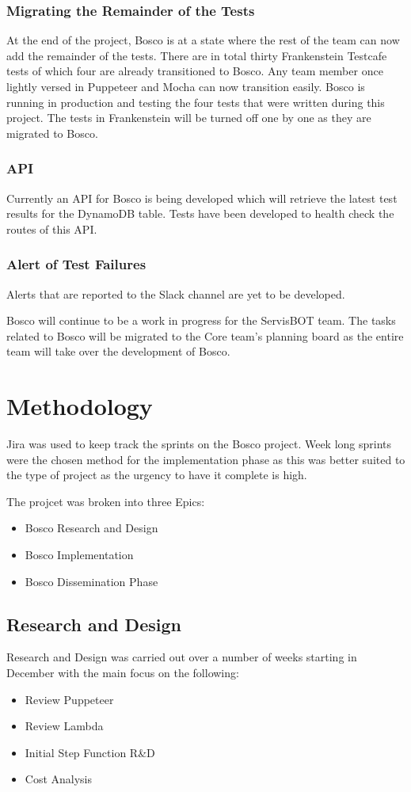 \documentclass[12pt,a4paper,titlepage]{report}
\begin{document}
\subsection{Migrating the Remainder of the Tests}
At the end of the project, Bosco is at a state where the rest of the team can now add the remainder of the tests. 
There are in total thirty Frankenstein Testcafe tests of which four are already transitioned to Bosco. Any team member once lightly versed in Puppeteer and Mocha can now transition easily. 
Bosco is running in production and testing the four tests that were written during this project. The tests in Frankenstein will be turned off one by one as 
they are migrated to Bosco. 

\subsection{API}
Currently an API for Bosco is being developed which will retrieve the latest test results for the DynamoDB table. 
Tests have been developed to health check the routes of this API. 

\subsection{Alert of Test Failures}
Alerts that are reported to the Slack channel are yet to be developed.

Bosco will continue to be a work in progress for the ServisBOT team. 
The tasks related to Bosco will be migrated to the Core team's planning board as the entire team will take over the development of Bosco. 

\appendix
\chapter{Methodology}
Jira was used to keep track the sprints on the Bosco project. Week long sprints were the chosen method for the implementation phase as this
was better suited to the type of project as the urgency to have it complete is high.

The projcet was broken into three Epics:

\begin{itemize}
  \item Bosco Research and Design
  \item Bosco Implementation
  \item Bosco Dissemination Phase
\end{itemize}
\section{Research and Design}
Research and Design was carried out over a number of weeks starting in December with the main focus on the following:
\begin{itemize}
\item Review Puppeteer
\item Review Lambda
\item Initial Step Function R\&D
\item Cost Analysis
\end{itemize}
\end{document}
